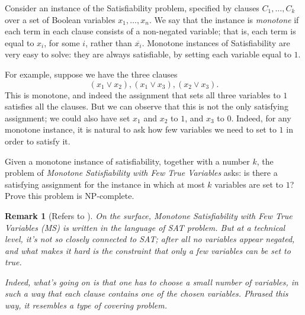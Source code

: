 \documentclass[11pt]{article}
\theoremstyle{numberplain}
\theoremstyle{nonumberplain}
\newtheorem{rem}{Remark}
\newcommand{\0}{{\mathbf{0}}}
\begin{document}
%
\begin{ques}[8-6] 
Consider an instance of the Satisfiability problem,
specified by clauses $C_1, \ldots, C_k$
over a set of Boolean variables $x_1, \ldots, x_n$.
We say that the instance is {\em monotone} if
each term in each clause consists of a non-negated
variable; that is, each term is equal to $x_i$,
for some $i$, rather than $\overline{x_i}$.
Monotone instances of Satisfiability are very easy to solve:
they are always satisfiable, by setting each
variable equal to $1$.

For example, suppose we have the three clauses
$$(x_1 \vee x_2), (x_1 \vee x_3), (x_2 \vee x_3).$$
This is monotone, and indeed the assignment
that sets all three variables to $1$ satisfies all the clauses.
But we can observe that this is not the only satisfying
assignment; we could also have set $x_1$ and $x_2$ to $1$,
and $x_3$ to $0$.
Indeed, for any monotone instance,
it is natural to ask how few variables
we need to set to $1$ in order to satisfy it.

Given a monotone instance of satisfiability, together with a number $k$,
the problem of
{\em Monotone Satisfiability with Few True Variables} asks:
is there a satisfying assignment for the instance in
which at most $k$ variables are set to $1$?
Prove this problem is NP-complete.
\end{ques}
\begin{rem}[Refers to \cite{solcornell}]
On the surface, {\em Monotone Satisfiability with Few True Variables}
(MS) is written in the language of SAT problem.
But at a technical level, it's not so closely connected to SAT; 
after all no variables appear negated, and what makes it
hard is the constraint that only a few variables can be set to true.
\par 
Indeed, what's going on is that one has to choose a
small number of variables, in such a way that 
each clause contains one of the chosen variables.
Phrased this way, it resembles a type of covering problem.
\end{rem}
\end{document}
